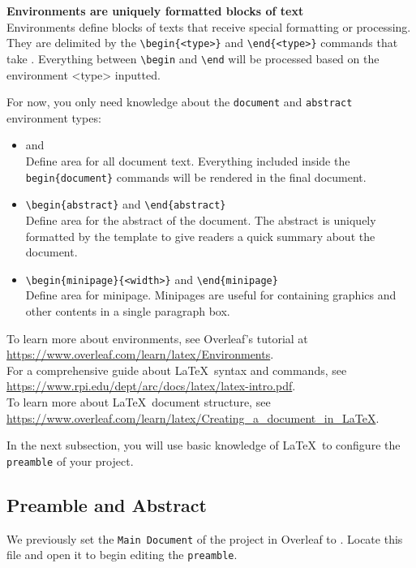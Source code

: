 {\large\textbf{Environments are uniquely formatted blocks of text}}\\
Environments define blocks of texts that receive special formatting or processing. They are delimited by the \verb|\begin{<type>}| and \verb|\end{<type>}| commands that take . Everything between \verb|\begin| and \verb|\end| will be processed based on the environment <type> inputted.
\par
For now, you only need knowledge about the \texttt{document} and \texttt{abstract} environment types:\\
\begin{itemize}
\item\verb|| and \verb||\\
Define area for all document text. Everything included inside the \verb|begin{document}| \verb|| commands will be rendered in the final document.

\item\verb|\begin{abstract}| and \verb|\end{abstract}|\\
Define area for the abstract of the document. The abstract is uniquely formatted by the template to give readers a quick summary about the document.

\item\verb|\begin{minipage}{<width>}| and \verb|\end{minipage}|\\
Define area for minipage. Minipages are useful for containing graphics and other contents in a single paragraph box.
\end{itemize}

\par
To learn more about environments, see Overleaf's tutorial at \url{https://www.overleaf.com/learn/latex/Environments}.\\
For a comprehensive guide about \LaTeX\ syntax and commands, see \url{https://www.rpi.edu/dept/arc/docs/latex/latex-intro.pdf}.\\
To learn more about \LaTeX\ document structure, see \url{https://www.overleaf.com/learn/latex/Creating_a_document_in_LaTeX}.
\par
In the next subsection, you will use basic knowledge of \LaTeX\ to configure the \texttt{preamble} of your project.

\subsection{Preamble and Abstract}
We previously set the \texttt{Main Document} of the project in Overleaf to
. Locate this file and open it to begin editing the \texttt{preamble}.

